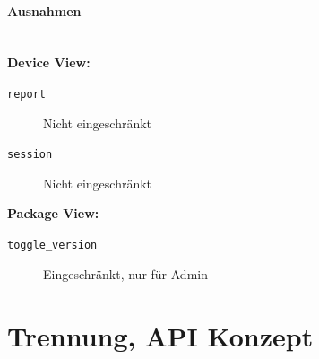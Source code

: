 \paragraph{Ausnahmen} \hspace{0pt} \\

\textbf{Device View:}
\begin{description}
    \item [\texttt{report}] Nicht eingeschränkt
    \item [\texttt{session}] Nicht eingeschränkt
\end{description}

\textbf{Package View:}
\begin{description}
    \item [\texttt{toggle\_version}] Eingeschränkt, nur für Admin
\end{description}



\section{Trennung, API Konzept}

